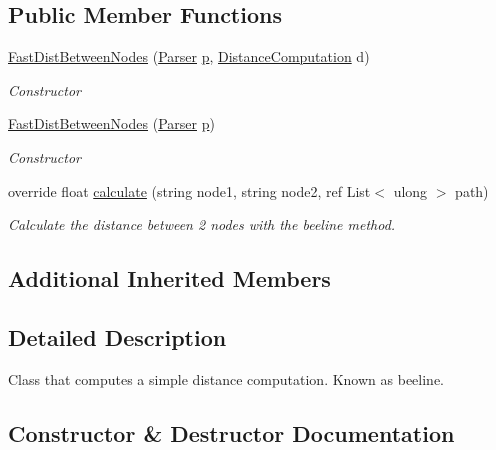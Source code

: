 \subsection*{Public Member Functions}
\begin{DoxyCompactItemize}
\item 
\hyperlink{classFastDistBetweenNodes_a4274589c4648431331e94f7345edae55}{Fast\+Dist\+Between\+Nodes} (\hyperlink{classParser}{Parser} \hyperlink{classDistBetweenNodes_a2a87914cc1b9e98fa17635950df55bd9}{p}, \hyperlink{classDistanceComputation}{Distance\+Computation} d)
\begin{DoxyCompactList}\small\item\em Constructor \end{DoxyCompactList}\item 
\hyperlink{classFastDistBetweenNodes_a86cf5744fe21f5c33314d1ab599c6067}{Fast\+Dist\+Between\+Nodes} (\hyperlink{classParser}{Parser} \hyperlink{classDistBetweenNodes_a2a87914cc1b9e98fa17635950df55bd9}{p})
\begin{DoxyCompactList}\small\item\em Constructor \end{DoxyCompactList}\item 
override float \hyperlink{classFastDistBetweenNodes_ac178cac6f6b5fc2f884a38fa6ce0e6af}{calculate} (string node1, string node2, ref List$<$ ulong $>$ path)
\begin{DoxyCompactList}\small\item\em Calculate the distance between 2 nodes with the beeline method. \end{DoxyCompactList}\end{DoxyCompactItemize}
\subsection*{Additional Inherited Members}


\subsection{Detailed Description}
Class that computes a simple distance computation. Known as beeline. 



\subsection{Constructor \& Destructor Documentation}
\mbox{\label{classFastDistBetweenNodes_a4274589c4648431331e94f7345edae55}} 
